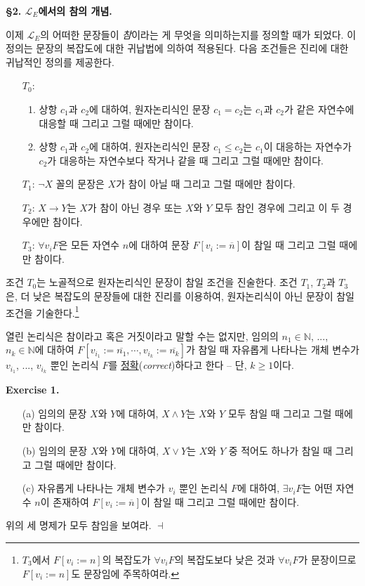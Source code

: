 \documentclass[12pt]{paper}
\newenvironment{context}[1][]
{ \noindent \textbf{{#1}.} }
{ \hfill $ \dashv $ }
\begin{document}
\noindent \textbf{\S2. $\mathcal{L}_{E}$에서의 참의 개념.}

이제 $\mathcal{L}_{E}$의 어떠한 문장들이 \textit{참}이라는 게 무엇을 의미하는지를 정의할 때가 되었다.
이 정의는 문장의 복잡도에 대한 귀납법에 의하여 적용된다.
다음 조건들은 진리에 대한 귀납적인 정의를 제공한다.
\begin{itemize}
\item[$T_{0}$:]
\begin{enumerate}
\item 상항 $c_{1}$과 $c_{2}$에 대하여, 원자논리식인 문장 $c_{1} = c_{2}$는 $c_{1}$과 $c_{2}$가 같은 자연수에 대응할 때 그리고 그럴 때에만 참이다.
\item 상항 $c_{1}$과 $c_{2}$에 대하여, 원자논리식인 문장 $c_{1} \leq c_{2}$는 $c_{1}$이 대응하는 자연수가 $c_{2}$가 대응하는 자연수보다 작거나 같을 때 그리고 그럴 때에만 참이다.
\end{enumerate}
\item[$T_{1}$:] $\lnot X$ 꼴의 문장은 $X$가 참이 아닐 때 그리고 그럴 때에만 참이다.
\item[$T_{2}$:] $X \rightarrow Y$는 $X$가 참이 아닌 경우 또는 $X$와 $Y$ 모두 참인 경우에 그리고 이 두 경우에만 참이다.
\item[$T_{3}$:] $\forall v_{i} F$은 모든 자연수 $n$에 대하여 문장 $F \left[ v_{i} := \overline{n} \right]$이 참일 때 그리고 그럴 때에만 참이다.
\end{itemize}

조건 $T_{0}$는 노골적으로 원자논리식인 문장이 참일 조건을 진술한다.
조건 $T_{1}$, $T_{2}$과 $T_{3}$은,
더 낮은 복잡도의 문장들에 대한 진리를 이용하여,
원자논리식이 아닌 문장이 참일 조건을 기술한다.\footnote
{
$T_{3}$에서 $F \left[ v_{i} := n \right] $의 복잡도가 $\forall v_{i} F$의 복잡도보다 낮은 것과
$\forall v_{i} F$가 문장이므로 $F \left[ v_{i} := n \right]$도 문장임에 주목하여라.
}

열린 논리식은 참이라고 혹은 거짓이라고 말할 수는 없지만,
임의의 $n_{1} \in \mathbb{N}$, ..., $n_{k} \in \mathbb{N}$에 대하여 $F \left[ v_{i_{1}} := \overline{n_{1}} , \cdots , v_{i_{k}} := \overline{n_{k}} \right]$가 참일 때
자유롭게 나타나는 개체 변수가 $v_{i_{1}}$, ..., $v_{i_{k}}$ 뿐인 논리식 $F$를 \underline{정확}(\textit{correct})하다고 한다 --
단, $k \geq 1$이다.

\begin{context}[Exercise 1]
\begin{enumerate}
\item[(a)] 임의의 문장 $X$와 $Y$에 대하여, $X \land Y$는 $X$와 $Y$ 모두 참일 때 그리고 그럴 때에만 참이다.
\item[(b)] 임의의 문장 $X$와 $Y$에 대하여, $X \lor Y$는 $X$와 $Y$ 중 적어도 하나가 참일 때 그리고 그럴 때에만 참이다.
\item[(c)] 자유롭게 나타나는 개체 변수가 $v_{i}$ 뿐인 논리식 $F$에 대하여, $\exists v_{i} F$는 어떤 자연수 $n$이 존재하여 $F \left[ v_{i} := \overline{n} \right]$이 참일 때 그리고 그럴 때에만 참이다.
\end{enumerate}

위의 세 명제가 모두 참임을 보여라.
\end{context}
\end{document}
